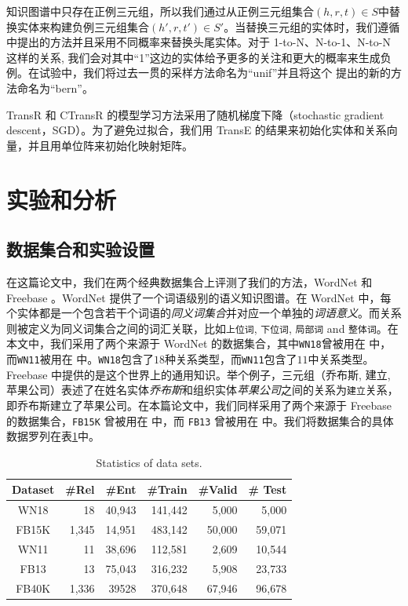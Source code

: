     知识图谱中只存在正例三元组，所以我们通过从正例三元组集合$(h, r, t) \in S$中替换实体来构建负例三元组集合$(h', r, t') \in S'$。当替换三元组的实体时，我们遵循  中提出的方法并且采用不同概率来替换头尾实体。对于 1-to-N、N-to-1、N-to-N 这样的关系, 我们会对其中``1''这边的实体给予更多的关注和更大的概率来生成负例。在试验中，我们将过去一贯的采样方法命名为``unif''并且将这个  提出的新的方法命名为``bern''。

    TransR 和 CTransR 的模型学习方法采用了随机梯度下降（stochastic gradient descent，SGD）。为了避免过拟合，我们用 TransE 的结果来初始化实体和关系向量，并且用单位阵来初始化映射矩阵。


    \section{实验和分析}
    \label{sec:experiment}

    \subsection{数据集合和实验设置}
    在这篇论文中，我们在两个经典数据集合上评测了我们的方法，WordNet  和 Freebase 。WordNet 提供了一个词语级别的语义知识图谱。在 WordNet 中，每个实体都是一个包含若干个词语的\emph{同义词集合}并对应一个单独的\emph{词语意义}。而关系则被定义为同义词集合之间的词汇关联，比如\texttt{上位词}, \texttt{下位词}, \texttt{局部词} and \texttt{整体词}。在本文中，我们采用了两个来源于 WordNet 的数据集合，其中\texttt{WN18}曾被用在  中，而\texttt{WN11}被用在  中。\texttt{WN18}包含了$18$种关系类型，而\texttt{WN11}包含了$11$中关系类型。Freebase 中提供的是这个世界上的通用知识。举个例子，三元组（乔布斯, 建立, 苹果公司）表述了在姓名实体\emph{乔布斯}和组织实体\emph{苹果公司}之间的关系为\texttt{建立}关系，即乔布斯建立了苹果公司。在本篇论文中，我们同样采用了两个来源于 Freebase 的数据集合，\texttt{FB15K} 曾被用在  中，而 \texttt{FB13} 曾被用在  中。我们将数据集合的具体数据罗列在表\ref{table_1:statistics}中。

    \begin{table}[h]
    \small
    \centering
    \caption{Statistics of data sets.}
    \label{table_1:statistics}
    \begin{tabular}{|c|rrrrr|}
    \hline
    Dataset &\#Rel& \#Ent& \#Train& \#Valid& \# Test\\
    \hline
    WN18  & 18     & 40,943  &141,442 & 5,000  & 5,000\\
    FB15K & 1,345 & 14,951 & 483,142 & 50,000& 59,071\\
    WN11  &11       & 38,696 & 112,581 & 2,609  &10,544\\
    FB13   &13       & 75,043 &316,232  &5,908  &23,733\\
    FB40K & 1,336 & 39528 &370,648 &67,946&96,678\\
    \hline
    \end{tabular}
    \end{table}

